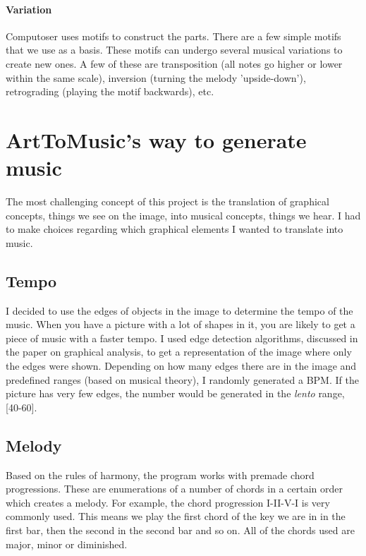 \documentclass[12pt]{article}
\begin{document}
\paragraph{Variation} Computoser uses motifs to construct the parts. There are a few simple motifs that we use as a basis. These motifs can undergo several musical variations to create new ones. A few of these are transposition (all notes go higher or lower within the same scale), inversion (turning the melody 'upside-down'), retrograding (playing the motif backwards), etc.

\section{ArtToMusic's way to generate music}

The most challenging concept of this project is the translation of graphical concepts, things we see on the image, into musical concepts, things we hear. I had to make choices regarding which graphical elements I wanted to translate into music.

\subsection{Tempo}

I decided to use the edges of objects in the image to determine the tempo of the music. When you have a picture with a lot of shapes in it, you are likely to get a piece of music with a faster tempo. I used edge detection algorithms, discussed in the paper on graphical analysis, to get a representation of the image where only the edges were shown.
Depending on how many edges there are in the image and predefined ranges (based on musical theory), I randomly generated a BPM.
If the picture has very few edges, the number would be generated in the \textit{lento} range, [40-60].

\subsection{Melody}

Based on the rules of harmony, the program works with premade chord progressions. These are enumerations of a number of chords in a certain order which creates a melody. For example, the chord progression I-II-V-I is very commonly used. This means we play the first chord of the key we are in in the first bar, then the second in the second bar and so on. All of the chords used are major, minor or diminished.
\newline
\end{document}
